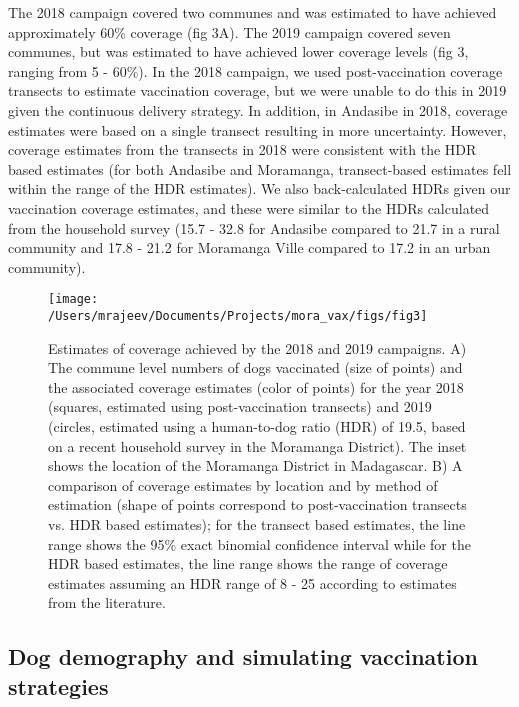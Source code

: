 \documentclass[tropicalmed,article,submit,moreauthors,pdftex]{mdpi}
\begin{document}
The 2018 campaign covered two communes and was estimated to have
achieved approximately 60\% coverage (fig 3A). The 2019 campaign covered
seven communes, but was estimated to have achieved lower coverage levels
(fig 3, ranging from 5 - 60\%). In the 2018 campaign, we used
post-vaccination coverage transects to estimate vaccination coverage,
but we were unable to do this in 2019 given the continuous delivery
strategy. In addition, in Andasibe in 2018, coverage estimates were
based on a single transect resulting in more uncertainty. However,
coverage estimates from the transects in 2018 were consistent with the
HDR based estimates (for both Andasibe and Moramanga, transect-based
estimates fell within the range of the HDR estimates). We also
back-calculated HDRs given our vaccination coverage estimates, and these
were similar to the HDRs calculated from the household survey (15.7 -
32.8 for Andasibe compared to 21.7 in a rural community and 17.8 - 21.2
for Moramanga Ville compared to 17.2 in an urban community).

\begin{figure}
\texttt{[image: /Users/mrajeev/Documents/Projects/mora\_vax/figs/fig3]} \caption{Estimates of coverage achieved by the 2018 and 2019 campaigns. A) The commune level numbers of dogs vaccinated (size of points) and the associated coverage estimates (color of points) for the year 2018 (squares, estimated using post-vaccination transects) and 2019 (circles, estimated using a human-to-dog ratio (HDR) of 19.5, based on a recent household survey in the Moramanga District). The inset shows the location of the Moramanga District in Madagascar. B) A comparison of coverage estimates by location and by method of estimation (shape of points correspond to post-vaccination transects vs. HDR based estimates); for the transect based estimates, the line range shows the 95\% exact binomial confidence interval while for the HDR based estimates, the line range shows the range of coverage estimates assuming an HDR range of 8 - 25 according to estimates from the literature.}\label{fig:fig3}
\end{figure}

\hypertarget{dog-demography-and-simulating-vaccination-strategies}{%
\subsection{Dog demography and simulating vaccination
strategies}\label{dog-demography-and-simulating-vaccination-strategies}}
\end{document}
